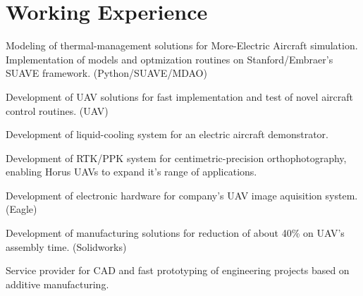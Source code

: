 \documentclass[A4]{deedy-resume} %
\begin{document}
\begin{minipage}[t]{0.67\textwidth} %



\section{Working Experience}


\vspace{\topsep} %
\begin{tightitemize}
 \item Modeling of thermal-management solutions for More-Electric Aircraft simulation. Implementation of models and optmization routines on Stanford/Embraer's SUAVE framework. (Python/SUAVE/MDAO)
 \item Development of UAV solutions for fast implementation and test of novel aircraft control routines. (UAV)
 \item Development of liquid-cooling system for an electric aircraft demonstrator.
\end{tightitemize}
\sectionspace %

\vspace{\topsep} %
\begin{tightitemize}
 \item Development of RTK/PPK system for centimetric-precision orthophotography, enabling Horus UAVs to expand it's range of applications.
 \item Development of electronic hardware for company's UAV image aquisition system. (Eagle)
 \item Development of manufacturing solutions for reduction of about 40\% on UAV's assembly time. (Solidworks)
\end{tightitemize}
\sectionspace %

\vspace{\topsep} %
\begin{tightitemize}
\item Service provider for CAD and fast prototyping of engineering projects based on additive manufacturing.
\end{tightitemize}


\end{minipage}
\end{document}
